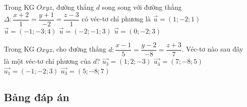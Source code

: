 \begin{ex}%
	Trong KG $Oxyz$, đường thẳng $d$ song song với đường thẳng $\Delta \colon \dfrac{x+2}{1}=\dfrac{y+1}{-2}=\dfrac{z-3}{1}$ có véc-tơ chỉ phương là
	\choice
	{\True $\overrightarrow{u}=(1;-2;1)$}
	{$\overrightarrow{u}=(-1;-3;4)$}
	{$\overrightarrow{u}=(-2;-1;3)$}
	{$\overrightarrow{u}=(0;-2;3)$}
\end{ex}

\begin{ex}%
	Trong KG $Oxyz$, cho đường thẳng $d \colon \dfrac{x-1}{5}=\dfrac{y-2}{-8}=\dfrac{z+3}{7}$. Véc-tơ nào sau đây là một véc-tơ chỉ phương của $d$?
	\choice
	{$\overrightarrow{u_3}=(1;2;-3)$}
	{$\overrightarrow{u_4}=(7;-8;5)$}
	{$\overrightarrow{u_1}=(-1;-2;3)$}
	{\True $\overrightarrow{u_3}=(5;-8;7)$}
\end{ex}

\subsection{Bảng đáp án}
